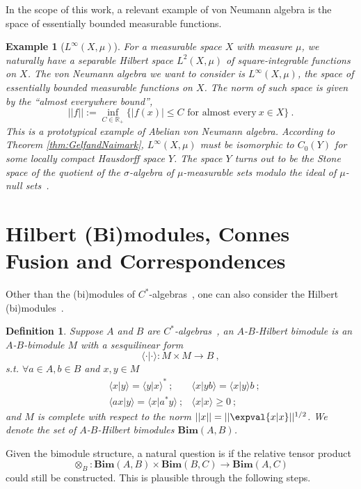 \documentclass[a4paper,11pt]{article}
\newtheorem{defn}[lemma]{Definition}
\newtheorem{exm}[lemma]{Example}
\newcommand{\be}{\begin{equation}}
\newcommand{\ee}{\end{equation}}
\newcommand{\ba}{\begin{aligned}}
\newcommand{\ea}{\end{aligned}}
\def\bbR{\mathbb{R}}
\def\calgs{$C^*$-algebras\ }
\begin{document}
In the scope of this work, a relevant example of von Neumann algebra is the space of essentially bounded measurable functions.
\begin{exm}[$L^{\infty}(X,\mu)$]
    For a measurable space $X$ with measure $\mu$, we naturally have a separable Hilbert space $L^2(X,\mu)$ of square-integrable functions on $X$. The von Neumann algebra we want to consider is $L^{\infty}(X,\mu)$, the space of essentially bounded measurable functions on $X$. The norm of such space is given by the ``almost everywhere bound'',
    \be ||f|| := \inf_{C\in \bbR_+} \{   |f(x)|\le C \text{ for almost every} \ x\in X \}  \ . \ee
    This is a prototypical example of Abelian von Neumann algebra. 
    According to Theorem \ref{thm:GelfandNaimark}, $L^{\infty}(X,\mu)$ must be isomorphic to $C_0(Y)$ for some locally compact Hausdorff space $Y$. The space $Y$ turns out to be the Stone space of the quotient of the $\sigma$-algebra of $\mu$-measurable sets modulo the ideal of $\mu$-null sets~\cite{Farah:2019}.
\end{exm}






\section{Hilbert (Bi)modules, Connes Fusion and Correspondences}\label{app:bimod}
Other than the (bi)modules of \calgs, one can also consider the Hilbert (bi)modules~\cite{Kaplansky:1953kln}.
\begin{defn}
    Suppose $A$ and $B$ are \calgs, an {\rm $A$-$B$-Hilbert bimodule} is an $A$-$B$-bimodule $M$ with a sesquilinear form
    \be  \langle\cdot | \cdot \rangle : M\times M \to B \ ,  \ee
    s.t. $\forall a\in A, b\in B$ and $x,y\in M$
    \be\ba
    &\langle x | y \rangle  = \langle y | x \rangle^* \ ;  &\langle x | yb \rangle = \langle x | y \rangle b \ ;\\
    &\langle ax | y \rangle  = \langle x | a^*y \rangle  \ ;      &\langle x | x \rangle\ge 0 \ ;
    \ea\ee
    and $M$ is complete with respect to the norm $||x||= ||\expval{x|x}||^{1/2}$. We denote the set of $A$-$B$-Hilbert bimodules $\mathbf{Bim}(A,B)$.
\end{defn}

Given the bimodule structure, a natural question is if the relative tensor product
\be \otimes_B : \mathbf{Bim}(A,B) \times \mathbf{Bim}(B,C)\to \mathbf{Bim}(A,C)  \ee
could still be constructed. This is plausible through the following steps.
\end{document}
